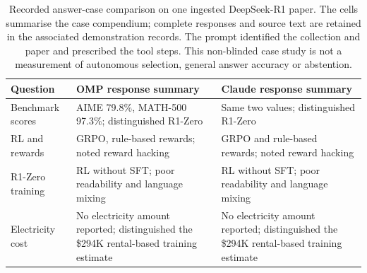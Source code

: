 \documentclass[final,5p,times,twocolumn]{elsarticle}
\begin{document}
\begin{table}[t]
\centering\small
\caption{Recorded answer-case comparison on one ingested DeepSeek-R1 paper.
The cells summarise the case compendium; complete responses and source text
are retained in the associated demonstration records. The prompt identified
the collection and paper and prescribed the tool steps. This non-blinded case
study is not a measurement of autonomous selection, general answer accuracy or
abstention.}
\label{tab:s-answer-cases}
\begin{tabular}{@{}p{}p{}p{}@{}}
\toprule
Question & OMP response summary & Claude response summary \\
\midrule
Benchmark scores & AIME 79.8\%, MATH-500 97.3\%; distinguished R1-Zero & Same two values; distinguished R1-Zero \\
RL and rewards & GRPO, rule-based rewards; noted reward hacking & GRPO and rule-based rewards; noted reward hacking \\
R1-Zero training & RL without SFT; poor readability and language mixing & RL without SFT; poor readability and language mixing \\
Electricity cost & No electricity amount reported; distinguished the \$294K rental-based training estimate & No electricity amount reported; distinguished the \$294K rental-based training estimate \\
\bottomrule
\end{tabular}
\end{table}
\end{document}
